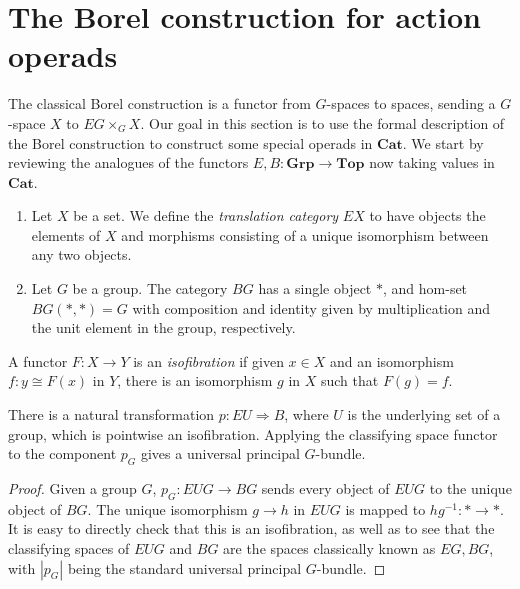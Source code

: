 \documentclass{amsbook} %
\newcommand{\mb}{\mathbf}
\numberwithin{section}{chapter}
\begin{document}
\section{The Borel construction for action operads}


The classical Borel construction is a functor from $G$-spaces to spaces, sending a $G$-space $X$ to $EG \times_{G} X$.  Our goal in this section is to use the formal description of the Borel construction to construct some special operads in $\mb{Cat}$.   We start by reviewing the analogues of the functors $E, B:\mb{Grp} \rightarrow \mb{Top}$ now taking values in $\mb{Cat}$.

\begin{Defi}\label{Defi:e_b}
\begin{enumerate}
\item Let $X$ be a set.  We define the \textit{translation category} $EX$ to have objects the elements of $X$ and morphisms consisting of a unique isomorphism between any two objects.
\item Let $G$ be a group.  The category $BG$ has a single object $*$, and hom-set $BG(*,*) = G$ with composition and identity given by multiplication and the unit element in the group, respectively.
\end{enumerate}
\end{Defi}

\begin{Defi}
A functor $F:X \to Y$ is an \emph{isofibration} if given $x \in X$ and an isomorphism $f: y \cong F(x)$ in $Y$, there is an isomorphism $g$ in $X$ such that $F(g) = f$.
\end{Defi}

\begin{prop}
There is a natural transformation $p:EU \Rightarrow B$, where $U$ is the underlying set of a group, which is pointwise an isofibration.  Applying the classifying space functor to the component $p_{G}$ gives a universal principal $G$-bundle.
\end{prop}
\begin{proof}
Given a group $G$, $p_{G}:EUG \rightarrow BG$ sends every object of $EUG$ to the unique object of $BG$.  The unique isomorphism $g \rightarrow  h$ in $EUG$ is mapped to $hg^{-1}:* \rightarrow *$.  It is easy to directly check that this is an isofibration, as well as to see that the classifying spaces of $EUG$ and $BG$ are the spaces classically known as $EG,BG$, with $|p_{G}|$ being the standard universal principal $G$-bundle.
\end{proof}
\end{document}
